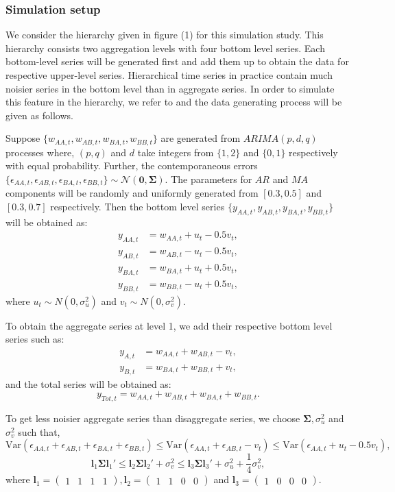 \documentclass[a4paper, 11pt]{article}
\begin{document}
	\subsubsection*{Simulation setup}
	
	We consider the hierarchy given in figure (1) for this simulation study. This hierarchy consists two aggregation levels with four bottom level series. Each bottom-level series will be generated first and add them up to obtain the data for respective upper-level series. Hierarchical time series in practice contain much noisier series in the bottom level than in aggregate series. In order to simulate this feature in the hierarchy, we refer to \citet{Wickramasuriya2017} and the data generating process will be given as follows.
	
	Suppose $\{w_{AA,t},w_{AB,t},w_{BA,t},w_{BB,t}\}$ are generated from $ARIMA(p,d,q)$ processes where, $(p,q)$ and $d$ take integers from $\{1,2\}$ and $\{0,1\}$ respectively with equal probability. Further, the contemporaneous errors $\{\epsilon_{AA,t},\epsilon_{AB,t},\epsilon_{BA,t},\epsilon_{BB,t}\} \sim \mathcal{N}(\bm{0}, \bm{\Sigma})$. The parameters for $AR$ and $MA$ components will be randomly and uniformly generated from $[0.3,0.5]$ and $[0.3,0.7]$ respectively. Then the bottom level series $\{y_{AA,t},y_{AB,t},y_{BA,t},y_{BB,t}\}$ will be obtained as:
	\begin{align*}
	y_{AA,t} &= w_{AA,t} + u_t - 0.5v_t,\\
	y_{AB,t} &= w_{AB,t} - u_t - 0.5v_t,\\
	y_{BA,t} &= w_{BA,t} + u_t + 0.5v_t,\\
	y_{BB,t} &= w_{BB,t} - u_t + 0.5v_t,
	\end{align*}
	where $u_t \sim N(0,\sigma^2_u)$ and $v_t \sim N(0,\sigma^2_v)$.
	
	To obtain the aggregate series at level 1, we add their respective bottom level series such as:
	\begin{align*}
	y_{A,t} &= w_{AA,t} + w_{AB,t} - v_t,\\
	y_{B,t} &= w_{BA,t} + w_{BB,t} + v_t,
	\end{align*}
	and the total series will be obtained as:
	$$y_{Tot,t} = w_{AA,t} + w_{AB,t} + w_{BA,t} + w_{BB,t}.$$
	
	To get less noisier aggregate series than disaggregate series, we choose $\bm{\Sigma}, \sigma^2_u$ and $\sigma^2_v$ such that,
	$$
	\text{Var}(\epsilon_{AA,t}+\epsilon_{AB,t}+\epsilon_{BA,t}+\epsilon_{BB,t}) \le \text{Var}(\epsilon_{AA,t}+\epsilon_{AB,t}-v_t) \le \text{Var}(\epsilon_{AA,t}+u_t-0.5v_t),
	$$
	$$
	\bm{l}_1\bm{\Sigma} \bm{l}_1' \le \bm{l}_2\bm{\Sigma} \bm{l}_2' + \sigma^2_v \le  \bm{l}_3\bm{\Sigma} \bm{l}_3' + \sigma^2_u + \frac{1}{4}\sigma^2_v,
	$$
	where $\bm{l}_1 = \begin{pmatrix} 1&1&1&1 \end{pmatrix}, \bm{l}_2 = \begin{pmatrix} 1&1&0&0 \end{pmatrix}$ and $\bm{l}_3 = \begin{pmatrix} 1&0&0&0 \end{pmatrix}$.
	
\end{document}
